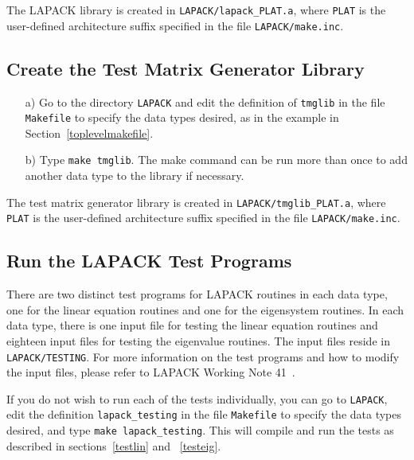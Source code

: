 \documentclass[11pt]{report}
\begin{document}
\noindent
The LAPACK library is created in \texttt{LAPACK/lapack\_PLAT.a}, where
\texttt{PLAT} is the user-defined architecture suffix specified in the file
\texttt{LAPACK/make.inc}.

\subsection{Create the Test Matrix Generator Library}

\begin{itemize}
\item[a)]
Go to the directory \texttt{LAPACK} and edit the definition of \texttt{tmglib}
in the file \texttt{Makefile} to specify the data types desired, as in the
example in Section~\ref{toplevelmakefile}.

\item[b)]
Type \texttt{make tmglib}.
The make command can be run more than once to add another
data type to the library if necessary.  

\end{itemize}

\noindent
The test matrix generator library is created in \texttt{LAPACK/tmglib\_PLAT.a},
where \texttt{PLAT} is the user-defined architecture suffix specified in the 
file \texttt{LAPACK/make.inc}.

\subsection{Run the LAPACK Test Programs}

There are two distinct test programs for LAPACK routines
in each data type, one for the linear equation routines and
one for the eigensystem routines.
In each data type, there is one input file for testing the linear
equation routines and eighteen input files for testing the eigenvalue
routines.
The input files reside in \texttt{LAPACK/TESTING}.
For more information on the test programs and how to modify the
input files, please refer to LAPACK Working Note 41~\cite{WN41}.

If you do not wish to run each of the tests individually, you can
go to \texttt{LAPACK}, edit the definition \texttt{lapack\_testing} in the file
\texttt{Makefile} to specify the data types desired, and type \texttt{make
lapack\_testing}.  This will
compile and run the tests as described in sections~\ref{testlin} 
and ~\ref{testeig}.

 
\end{document}
